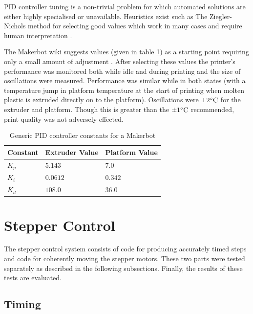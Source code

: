 		PID controller tuning is a non-trivial problem for which automated solutions
		are either highly specialised or unavailable. Heuristics exist such as The
		Ziegler-Nichols method for selecting good values which work in many cases
		and require human interpretation \cite{ziegler}.
		
		
		The Makerbot wiki suggests values (given in table \ref{tab:makerbotpid}) as
		a starting point requiring only a small amount of adjustment
		\cite{makerbotpid}. After selecting these values the printer's performance
		was monitored both while idle and during printing and the size of
		oscillations were measured. Performance was similar while in both states
		(with a temperature jump in platform temperature at the start of printing
		when molten plastic is extruded directly on to the platform). Oscillations
		were $\pm2^\circ\textrm{C}$ for the extruder and platform. Though this is greater than
		the $\pm1^\circ\textrm{C}$ recommended, print quality was not adversely effected.
		
		\begin{table}
			\centering
			\begin{tabular}{l l l}
				\toprule
				Constant & Extruder Value & Platform Value \\
				\midrule
				$K_p$    & $5.143$        & $7.0  $  \\
				$K_i$    & $0.0612$       & $0.342$ \\
				$K_d$    & $108.0$        & $36.0 $  \\
				\bottomrule
			\end{tabular}
			
			\caption{Generic PID controller constants for a Makerbot
			         \cite{makerbotpid}}
			\label{tab:makerbotpid}
		\end{table}
	
	\section{Stepper Control}
		
		The stepper control system consists of code for producing accurately timed
		steps and code for coherently moving the stepper motors. These two parts
		were tested separately as described in the following subsections. Finally,
		the results of these tests are evaluated.
		
		\subsection{Timing}
			
